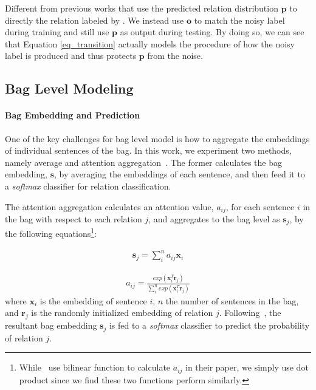 Different from previous works that use the predicted relation distribution $\mathbf{p}$ to directly  the relation labeled by \DS{}. We instead use $\mathbf{o}$ to match the noisy label during training and still use $\mathbf{p}$ as output during testing.
By doing so, we can see that Equation \ref{eq_transition} actually models the procedure of how the noisy label is produced and thus protects $\mathbf{p}$ from the noise.

\subsection{Bag Level Modeling}
\paragraph{Bag Embedding and Prediction}
One of the key challenges for bag level model is how to aggregate the embeddings of individual sentences of the bag.
In this work, we experiment two methods, namely average and attention aggregation~\cite{lin2016neural}.
The former calculates the bag embedding, $\mathbf{s}$, by averaging the embeddings of each sentence, and  then feed it to a \emph{softmax} classifier for relation classification.

The attention aggregation calculates an attention value, $a_{ij}$, for each sentence $i$ in the bag with respect to each relation $j$, and aggregates to  the bag level as  $\mathbf{s}_j$, by the following equations\footnote{While~\cite{lin2016neural} use bilinear function to calculate $a_{ij}$ in their paper, we simply use dot product since we find these two functions perform similarly.}:

\begin{equation}
\begin{aligned}
\mathbf{s}_j = \sum_i^{n}{a_{ij} \mathbf{x}_{i}}
\end{aligned}
\label{att_sum}
\end{equation}

\begin{equation}
\begin{aligned}
a_{ij} = \frac{exp(\mathbf{x}_i^T \mathbf{r}_j)}{\sum_i^n{exp(\mathbf{x}_i^T \mathbf{r}_j)}}
\end{aligned}
\label{cal_att}
\end{equation}
where $\mathbf{x}_{i}$ is the embedding of sentence $i$, $n$ the number of sentences in the bag, and $\mathbf{r}_j$ is the randomly initialized embedding of relation $j$.
Following~\cite{lin2016neural}, the resultant bag embedding $\mathbf{s}_j$ is fed to a \emph{softmax} classifier to predict the probability of relation $j$.  

